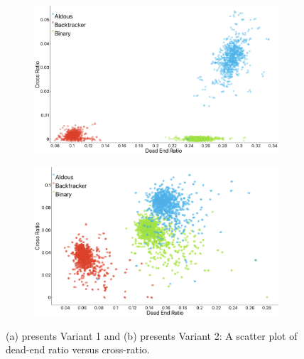          \begin{figure}[!h]
            \centering
            \begin{subfigure}[!h]{0.7\textwidth}
                \includegraphics[width=1\linewidth]{crossvSDeas_variant1.png}
               \caption{}
            \end{subfigure}
            \begin{subfigure}[!h]{0.7\textwidth}
                \includegraphics[width=1\linewidth]{crossvSDead_variant2.png}
               \caption{}
            \end{subfigure}
            \caption{(a) presents Variant 1 and (b) presents Variant 2: A scatter plot of dead-end ratio versus cross-ratio.}
            \end{figure}

